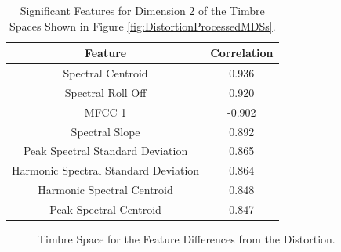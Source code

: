 	\begin{table}[h!]
		\centering
		\begin{tabular}{|c|c|}
			\hline
			\bf{Feature} & \bf{Correlation} \\
			\hline
			\hline
			Spectral Centroid &  0.936 \\
			\hline
			Spectral Roll Off &  0.920 \\
			\hline
			MFCC 1 & -0.902 \\
			\hline
			Spectral Slope &  0.892 \\
			\hline
			Peak Spectral Standard Deviation &  0.865 \\
			\hline
			Harmonic Spectral Standard Deviation &  0.864 \\
			\hline
			Harmonic Spectral Centroid &  0.848 \\
			\hline
			Peak Spectral Centroid &  0.847 \\
			\hline
		\end{tabular}
		\caption{Significant Features for Dimension 2 of the Timbre Spaces Shown in Figure 
			 \ref{fig:DistortionProcessedMDSs}.}
		\label{tab:DistortionProcessedFeaturesDim2}
	\end{table}

	\begin{figure}[h!]
		\centering
		\qquad
		\caption{Timbre Space for the Feature Differences from the Distortion.}
		\label{fig:DistortionDifferenceMDSs}
	\end{figure}

